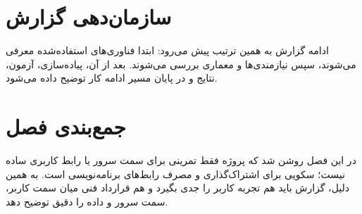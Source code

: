 \section{سازمان‌دهی گزارش}
ادامه گزارش به همین ترتیب پیش می‌رود: ابتدا فناوری‌های استفاده‌شده معرفی می‌شوند، سپس نیازمندی‌ها و معماری بررسی می‌شوند. بعد از آن، پیاده‌سازی، آزمون، نتایج و در پایان مسیر ادامه کار توضیح داده می‌شود.

\section{جمع‌بندی فصل}
در این فصل روشن شد که پروژه فقط تمرینی برای سمت سرور یا رابط کاربری ساده نیست؛ سکویی برای اشتراک‌گذاری و مصرف رابط‌های برنامه‌نویسی است. به همین دلیل، گزارش باید هم تجربه کاربر را جدی بگیرد و هم قرارداد فنی میان سمت کاربر، سمت سرور و داده را دقیق توضیح دهد.
